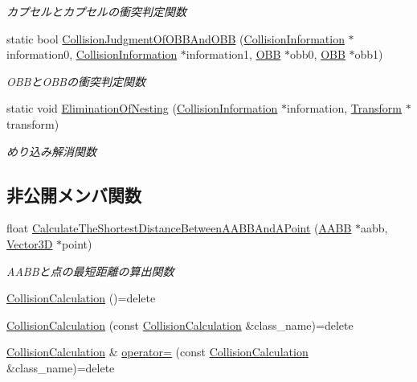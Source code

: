 \begin{DoxyCompactItemize}
\begin{DoxyCompactList}\small\item\em カプセルとカプセルの衝突判定関数 \end{DoxyCompactList}\item 
static bool \mbox{\hyperlink{class_collision_calculation_ae61b3fec7bc5487d9e48ce0294cca516}{Collision\+Judgment\+Of\+O\+B\+B\+And\+O\+BB}} (\mbox{\hyperlink{class_collision_information}{Collision\+Information}} $\ast$information0, \mbox{\hyperlink{class_collision_information}{Collision\+Information}} $\ast$information1, \mbox{\hyperlink{class_o_b_b}{O\+BB}} $\ast$obb0, \mbox{\hyperlink{class_o_b_b}{O\+BB}} $\ast$obb1)
\begin{DoxyCompactList}\small\item\em O\+B\+Bと\+O\+B\+Bの衝突判定関数 \end{DoxyCompactList}\item 
static void \mbox{\hyperlink{class_collision_calculation_a4e468d6ff8add6b08f0b65d3e7128411}{Elimination\+Of\+Nesting}} (\mbox{\hyperlink{class_collision_information}{Collision\+Information}} $\ast$information, \mbox{\hyperlink{class_transform}{Transform}} $\ast$transform)
\begin{DoxyCompactList}\small\item\em めり込み解消関数 \end{DoxyCompactList}\end{DoxyCompactItemize}
\subsection*{非公開メンバ関数}
\begin{DoxyCompactItemize}
\item 
float \mbox{\hyperlink{class_collision_calculation_ac06f2aa7df28c6331070b85d48760b59}{Calculate\+The\+Shortest\+Distance\+Between\+A\+A\+B\+B\+And\+A\+Point}} (\mbox{\hyperlink{class_a_a_b_b}{A\+A\+BB}} $\ast$aabb, \mbox{\hyperlink{class_vector3_d}{Vector3D}} $\ast$point)
\begin{DoxyCompactList}\small\item\em A\+A\+B\+Bと点の最短距離の算出関数 \end{DoxyCompactList}\item 
\mbox{\hyperlink{class_collision_calculation_adfd1c367b0e22ce1240185efe11d6c98}{Collision\+Calculation}} ()=delete
\item 
\mbox{\hyperlink{class_collision_calculation_a7fa8ad5ebc7cb5554bd071756140771a}{Collision\+Calculation}} (const \mbox{\hyperlink{class_collision_calculation}{Collision\+Calculation}} \&class\+\_\+name)=delete
\item 
\mbox{\hyperlink{class_collision_calculation}{Collision\+Calculation}} \& \mbox{\hyperlink{class_collision_calculation_a20738fa64ae8749165328d48ee90d32e}{operator=}} (const \mbox{\hyperlink{class_collision_calculation}{Collision\+Calculation}} \&class\+\_\+name)=delete
\end{DoxyCompactItemize}
